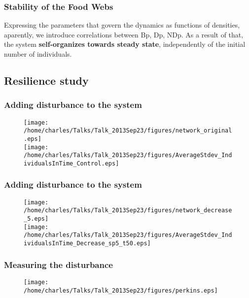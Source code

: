 \documentclass[xcolor=x11names,compress]{beamer}
\renewcommand{\(}{\begin{columns}}
\renewcommand{\)}{\end{columns}}
\newcommand{\<}[1]{\begin{column}{#1}}
\renewcommand{\>}{\end{column}}
\begin{document}
\begin{frame}
\frametitle{Stability of the Food Webs}
\begin{block}{}
Expressing the parameters that govern the dynamics as functions of densities, aparently, we introduce correlations between Bp, Dp, NDp. As a result of that, the system \textbf{self-organizes towards steady state}, independently of the initial number of individuals. 
\end{block}
\end{frame}



\subsection{Resilience study}
\begin{frame}
\frametitle{Adding disturbance to the system}
\begin{figure}
 \texttt{[image: /home/charles/Talks/Talk\_2013Sep23/figures/network\_original.eps]} \\ 
 \texttt{[image: /home/charles/Talks/Talk\_2013Sep23/figures/AverageStdev\_IndividualsInTime\_Control.eps]} 
\end{figure}
\end{frame}

\begin{frame}
\frametitle{Adding disturbance to the system}
\begin{figure}
 \texttt{[image: /home/charles/Talks/Talk\_2013Sep23/figures/network\_decrease\_5.eps]} \\
 \texttt{[image: /home/charles/Talks/Talk\_2013Sep23/figures/AverageStdev\_IndividualsInTime\_Decrease\_sp5\_t50.eps]}
\end{figure}
\end{frame}

\begin{frame}
\frametitle{Measuring the disturbance}
\begin{figure}
 \texttt{[image: /home/charles/Talks/Talk\_2013Sep23/figures/perkins.eps]} 
\end{figure}
\end{frame}
\end{document}
